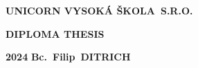 \pagestyle{empty}
\begin{center}
{\Large\bfseries\MakeUppercase{Unicorn Vysoká škola~s.r.o.}}
	\vfill

	{\Huge\bfseries\MakeUppercase{Diploma Thesis}} \\

	\vfill

	\noindent\begin{minipage}{\textwidth}
		         \begin{Large}
			         \textbf{2024} \hfill \textbf{Bc.~Filip~\MakeUppercase{Ditrich}}
		         \end{Large}
	\end{minipage}
\end{center}
